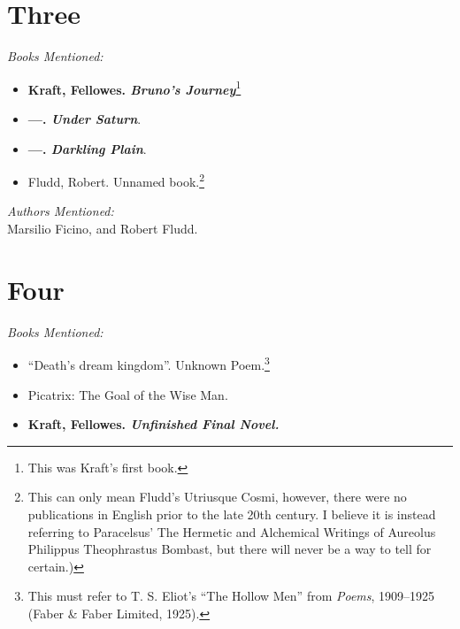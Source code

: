 \documentclass[12pt,makeidx]{extreport}
\begin{document}
\section{Three}
\textit{Books Mentioned:}
\begin{itemize}
\item \textbf{Kraft, Fellowes. \textit{Bruno's Journey}}\footnote{This was Kraft's first book.} \cite{Kraft1931}
\item \textbf{---. \textit{Under Saturn}}. \cite{Krafta}
\item \textbf{---. \textit{Darkling Plain}}. \cite{Kraft}
\item Fludd, Robert. Unnamed book.\footnote{This can only mean Fludd's Utriusque Cosmi, however, there were no publications in English prior to the late 20th century. I believe it is instead referring to Paracelsus' The Hermetic and Alchemical Writings of Aureolus Philippus Theophrastus Bombast, but there will never be a way to tell for certain.)}
\end{itemize}
\textit{Authors Mentioned:}\\
Marsilio Ficino, and Robert Fludd.

\section{Four}
\textit{Books Mentioned:}
\begin{itemize}
\item ``Death's dream kingdom''. Unknown Poem.\footnote{This must refer to T. S. Eliot's ``The Hollow Men'' from \textit{Poems}, 1909–1925 (Faber \& Faber Limited, 1925).}
\item Picatrix: The Goal of the Wise Man. \cite{Picatrix1962}
\item \textbf{Kraft, Fellowes. \textit{Unfinished Final Novel.}}
\end{itemize}
\end{document}
